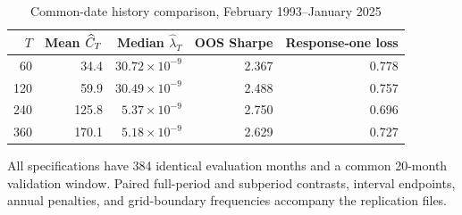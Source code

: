 \begin{table}[htbp]
\centering\small{}
\caption{Common-date history comparison, February 1993--January 2025}\label{tab:history}
\begin{tabular}{rrrrr}
\toprule
$T$ & Mean $\widehat C_T$ & Median $\widehat\lambda_T$ & OOS Sharpe & Response-one loss \\
\midrule
60 & 34.4 & $30.72\times10^{-9}$ & 2.367 & 0.778 \\
120 & 59.9 & $30.49\times10^{-9}$ & 2.488 & 0.757 \\
240 & 125.8 & $5.37\times10^{-9}$ & 2.750 & 0.696 \\
360 & 170.1 & $5.18\times10^{-9}$ & 2.629 & 0.727 \\
\bottomrule
\end{tabular}
\par\vspace{5pt}
\begin{minipage}{\textwidth}\footnotesize All specifications have 384 identical evaluation months and a common 20-month validation window. Paired full-period and subperiod contrasts, interval endpoints, annual penalties, and grid-boundary frequencies accompany the replication files.\end{minipage}
\end{table}
